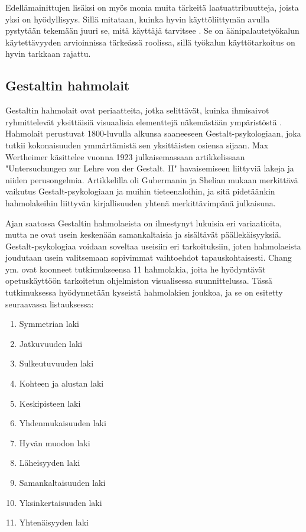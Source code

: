 \documentclass[utf8]{gradu3}
\begin{document}
Edellämainittujen lisäksi on myös monia muita tärkeitä laatuattribuutteja, joista yksi on hyödyllisyys. Sillä mitataan, kuinka hyvin käyttöliittymän avulla pystytään tekemään juuri se, mitä käyttäjä tarvitsee \parencite{intro-usability}. Se on äänipalautetyökalun käytettävyyden arvioinnissa tärkeässä roolissa, sillä työkalun käyttötarkoitus on hyvin tarkkaan rajattu. 

\subsection{Gestaltin hahmolait}

Gestaltin hahmolait ovat periaatteita, jotka selittävät, kuinka ihmisaivot ryhmittelevät yksittäisiä visuaalisia elementtejä näkemästään ympäristöstä \parencite{koffka}. Hahmolait perustuvat 1800-luvulla alkunsa saaneeseen Gestalt-psykologiaan, joka tutkii kokonaisuuden ymmärtämistä sen yksittäisten osiensa sijaan. Max Wertheimer käsittelee vuonna 1923 julkaisemassaan artikkelissaan "Untersuchungen zur Lehre von der Gestalt. II" havaisemiseen liittyviä lakeja ja niiden perusongelmia. Artikkelilla oli Gubermanin ja Shelian \parencite*{rearranged} mukaan merkittävä vaikutus Gestalt-psykologiaan ja muihin tieteenaloihin, ja sitä pidetäänkin hahmolakeihin liittyvän kirjallisuuden yhtenä merkittävimpänä julkaisuna. 

Ajan saatossa Gestaltin hahmolaeista on ilmestynyt lukuisia eri variaatioita, mutta ne ovat usein keskenään samankaltaisia ja sisältävät päällekäisyyksiä. Gestalt-psykologiaa voidaan soveltaa useisiin eri tarkoituksiin, joten hahmolaeista joudutaan usein valitsemaan sopivimmat vaihtoehdot tapauskohtaisesti. Chang ym. \parencite*{chang} ovat koonneet tutkimukseensa 11 hahmolakia, joita he hyödyntävät opetuskäyttöön tarkoitetun ohjelmiston visualisessa suunnittelussa. Tässä tutkimuksessa hyödynnetään kyseistä hahmolakien joukkoa, ja se on esitetty seuraavassa listauksessa:

\begin{enumerate}
  \item Symmetrian laki
  \item Jatkuvuuden laki
  \item Sulkeutuvuuden laki
  \item Kohteen ja alustan laki
  \item Keskipisteen laki
  \item Yhdenmukaisuuden laki
  \item Hyvän muodon laki
  \item Läheisyyden laki
  \item Samankaltaisuuden laki
  \item Yksinkertaisuuden laki
  \item Yhtenäisyyden laki
\end{enumerate}
\end{document}
